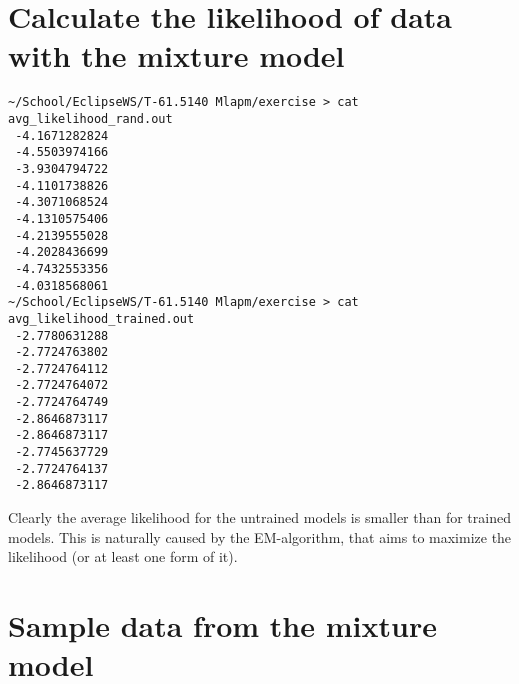 \documentclass[a4paper,oneside,article]{memoir}
\begin{document}
\section{Calculate the likelihood of data with the mixture model}

\begin{lstlisting}
~/School/EclipseWS/T-61.5140 Mlapm/exercise > cat avg_likelihood_rand.out 
 -4.1671282824
 -4.5503974166
 -3.9304794722
 -4.1101738826
 -4.3071068524
 -4.1310575406
 -4.2139555028
 -4.2028436699
 -4.7432553356
 -4.0318568061
~/School/EclipseWS/T-61.5140 Mlapm/exercise > cat avg_likelihood_trained.out 
 -2.7780631288
 -2.7724763802
 -2.7724764112
 -2.7724764072
 -2.7724764749
 -2.8646873117
 -2.8646873117
 -2.7745637729
 -2.7724764137
 -2.8646873117
\end{lstlisting}
Clearly the average likelihood for the untrained models is smaller than for trained models. This is
naturally caused by the EM-algorithm, that aims to maximize the likelihood (or at least one form of it).


\section{Sample data from the mixture model}
\end{document}
